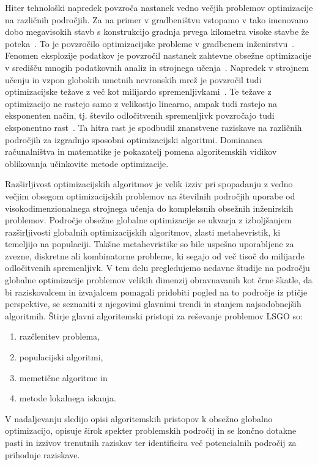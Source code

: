Hiter tehnološki napredek povzroča nastanek vedno večjih problemov optimizacije na različnih področjih.
Za na primer v gradbeništvu vstopamo v tako imenovano dobo megavisokih stavb s konstrukcijo gradnja prvega kilometra visoke stavbe že poteka~\cite{bib:tallest_20}.
To je povzročilo optimizacijske probleme v gradbenem inženirstvu~\cite{bib:lsgo_engineering}.
Fenomen eksplozije podatkov je povzročil nastanek zahtevne obsežne optimizacije v središču mnogih podatkovnih analiz in strojnega učenja~\cite{bib:lsgo_machine_learning}.
Napredek v strojnem učenju in vzpon globokih umetnih nevronskih mrež je povzročil tudi optimizacijske težave z več kot milijardo spremenljivkami~\cite{bib:lsgo_deep_learning}.
Te težave z optimizacijo ne rastejo samo z velikostjo linearno, ampak tudi rastejo na eksponenten način, tj. število odločitvenih spremenljivk povzročajo tudi eksponentno rast~\cite{bib:lsgo_exponential_grouth}.
Ta hitra rast je spodbudil znanstvene raziskave na različnih področjih za izgradnjo sposobni optimizacijski algoritmi.
Dominanca računalništva in matematike je pokazatelj pomena algoritemskih vidikov oblikovanja učinkovite metode optimizacije.

Razširljivost optimizacijskih algoritmov je velik izziv pri spopadanju z vedno večjim obsegom optimizacijskih problemov na številnih področjih uporabe od visokodimenzionalnega strojnega učenja do kompleksnih obsežnih inženirskih problemov.
Področje obsežne globalne optimizacije se ukvarja z izboljšanjem razširljivosti globalnih optimizacijskih algoritmov, zlasti metahevristik, ki temeljijo na populaciji.
Takšne metahevristike so bile uspešno uporabljene za zvezne, diskretne ali kombinatorne probleme, ki segajo od več tisoč do milijarde odločitvenih spremenljivk.
V tem delu pregledujemo nedavne študije na področju globalne optimizacije problemov velikih dimenzij obravnavanih kot črne škatle, da bi raziskovalcem in izvajalcem pomagali pridobiti pogled na to področje iz ptičje perspektive, se seznaniti z njegovimi glavnimi trendi in stanjem najsodobnejših algoritmih.
Štirje glavni algoritemski pristopi za reševanje problemov LSGO so:
\begin{enumerate}
	\item razčlenitev problema,
	\item populacijski algoritmi,
	\item memetične algoritme in
	\item metode lokalnega iskanja.
\end{enumerate}
V nadaljevanju sledijo opisi algoritemskih pristopov k obsežno globalno optimizacijo, opisuje širok spekter problemskih področij in se končno dotakne pasti in izzivov trenutnih raziskav ter identificira več potencialnih področij za prihodnje raziskave.

